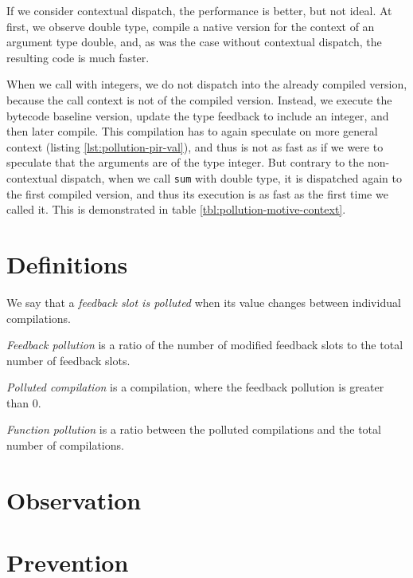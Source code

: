 If we consider contextual dispatch, the performance is better, but not ideal. At first, we observe double type, compile a native version for the context of an argument type double, and, as was the case without contextual dispatch, the resulting code is much faster.

When we call with integers, we do not dispatch into the already compiled version, because the call context is not  of the compiled version. Instead, we execute the bytecode baseline version, update the type feedback to include an integer, and then later compile. This compilation has to again speculate on more general context (listing \ref{lst:pollution-pir-val}), and thus is not as fast as if we were to speculate that the arguments are of the type integer. But contrary to the non-contextual dispatch, when we call \texttt{sum} with double type, it is dispatched again to the first compiled version, and thus its execution is as fast as the first time we called it. This is demonstrated in table \ref{tbl:pollution-motive-context}.

\section{Definitions}

We say that a \textit{feedback slot is polluted} when its value changes between individual compilations.

\textit{Feedback pollution} is a ratio of the number of modified feedback slots to the total number of feedback slots.

\textit{Polluted compilation} is a compilation, where the feedback pollution is greater than 0.

\textit{Function pollution} is a ratio between the polluted compilations and the total number of compilations.

\section{Observation}


\section{Prevention}


